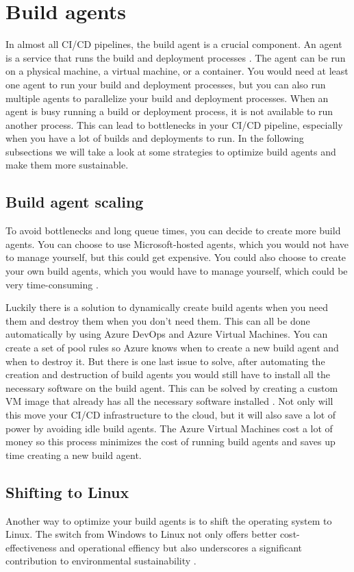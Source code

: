 \section{Build agents}
In almost all CI/CD pipelines, the build agent is a crucial component. An agent is a service that runs the build and deployment processes \autocite{packtpub}.
The agent can be run on a physical machine, a virtual machine, or a container. 
You would need at least one agent to run your build and deployment processes, but you can also run multiple agents to parallelize your build and deployment processes.
When an agent is busy running a build or deployment process, it is not available to run another process.
This can lead to bottlenecks in your CI/CD pipeline, especially when you have a lot of builds and deployments to run.
In the following subsections we will take a look at some strategies to optimize build agents and make them more sustainable.

\subsection{Build agent scaling}
To avoid bottlenecks and long queue times, you can decide to create more build agents.
You can choose to use Microsoft-hosted agents, which you would not have to manage yourself, but this could get expensive.
You could also choose to create your own build agents, which you would have to manage yourself, which could be very time-consuming \autocite{hexmaster}.

Luckily there is a solution to dynamically create build agents when you need them and destroy them when you don't need them.
This can all be done automatically by using Azure DevOps and Azure Virtual Machines. You can create a set of pool rules so Azure knows when to create a new build agent and when to destroy it.
But there is one last issue to solve, after automating the creation and destruction of build agents you would still have to install all the necessary software on the build agent.
This can be solved by creating a custom VM image that already has all the necessary software installed \autocite{hexmaster}.
Not only will this move your CI/CD infrastructure to the cloud, but it will also save a lot of power by avoiding idle build agents.
The Azure Virtual Machines cost a lot of money so this process minimizes the cost of running build agents and saves up time creating a new build agent.

\subsection{Shifting to Linux}
Another way to optimize your build agents is to shift the operating system to Linux. 
The switch from Windows to Linux not only offers better cost-effectiveness and operational effiency but also underscores a significant contribution to environmental sustainability \autocite{medium}.
